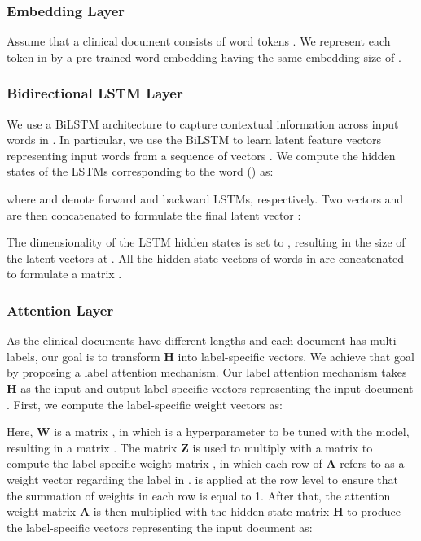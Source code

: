 \documentclass{article}
\begin{document}
\subsubsection{Embedding Layer} Assume that a clinical document  consists of  word tokens . We represent each  token  in  by a pre-trained word embedding  having the same embedding size of . 







\subsubsection{Bidirectional LSTM Layer} We use a BiLSTM architecture to capture contextual information across input words in . In particular, we use the BiLSTM to learn latent feature vectors representing input words from a sequence  of vectors . 
We compute the hidden states of the LSTMs corresponding to the   word  () as:

\noindent where  and  denote forward and backward LSTMs, respectively. Two vectors  and  are then concatenated to formulate the final latent vector :




The dimensionality of the LSTM hidden states is set to , resulting in the size of the latent vectors   at . All the hidden state vectors of words in  are concatenated to formulate a matrix . 




\subsubsection{Attention Layer} As the clinical documents have different lengths and each document has multi-labels, our goal is to transform \textbf{H} into label-specific vectors. We achieve that goal by proposing a label attention mechanism. Our label attention mechanism takes \textbf{H}  as the input and output  label-specific vectors representing the input document .  First, we compute the label-specific weight vectors as:


\noindent Here, \textbf{W} is a matrix , in which  is a hyperparameter to be tuned with the model, resulting in a matrix . The matrix \textbf{Z} is used to multiply with a matrix  to compute the label-specific weight matrix , in which each  row of \textbf{A} refers to as a weight vector regarding the  label in .  is applied at the row level to ensure that the summation of weights in each row  is equal to 1. 
After that, the attention weight matrix  \textbf{A} is then multiplied  with the hidden state matrix \textbf{H} to produce the label-specific vectors representing the input document  as:
\end{document}
